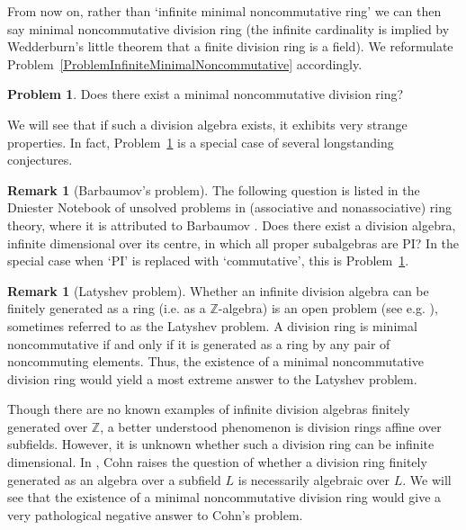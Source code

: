 \documentclass[11pt]{article}
\theoremstyle{definition}
\newtheorem{problem}[corollary]{Problem}
\newtheorem{remark}[corollary]{Remark}
\begin{document}
From now on, rather than `infinite minimal noncommutative ring' we can then say minimal noncommutative division ring (the infinite cardinality is implied by Wedderburn's little theorem that a finite division ring is a field). We reformulate Problem~\ref{ProblemInfiniteMinimalNoncommutative} accordingly.

\begin{problem}\label{ProblemMinimalNoncommutativeDivision}
Does there exist a minimal noncommutative division ring?\end{problem}

We will see that if such a division algebra exists, it exhibits very strange properties. In fact, Problem~\ref{ProblemMinimalNoncommutativeDivision} is a special case of several longstanding conjectures.

\begin{remark}[Barbaumov's problem]\label{RemarkBarbaumov}
The following question is listed in the Dniester Notebook of unsolved problems in (associative and nonassociative) ring theory, where it is attributed to Barbaumov \cite[Problem~1.14]{DniesterNotebook}. Does there exist a division algebra, infinite dimensional over its centre, in which all proper subalgebras are PI? In the special case when `PI' is replaced with `commutative', this is Problem~\ref{ProblemMinimalNoncommutativeDivision}.
\end{remark}

\begin{remark}[Latyshev problem]\label{RemarkLatyshev}
Whether an infinite division algebra can be finitely generated as a ring (i.e. as a $\mathbb{Z}$-algebra) is an open problem (see e.g. \cite[Problem~1.171]{DniesterNotebook}), sometimes referred to as the Latyshev problem. A division ring is minimal noncommutative if and only if it is generated as a ring by any pair of noncommuting elements. Thus, the existence of a minimal noncommutative division ring would yield a most extreme answer to the Latyshev problem.
\end{remark}

Though there are no known examples of infinite division algebras finitely generated over $\mathbb{Z}$, a better understood phenomenon is division rings affine over subfields. However, it is unknown whether such a division ring can be infinite dimensional. In \cite[p.412]{SkewFieldsCohn}, Cohn raises the question of whether a division ring finitely generated as an algebra over a subfield $L$ is necessarily algebraic over $L$. We will see that the existence of a minimal noncommutative division ring would give a very pathological negative answer to Cohn's problem.
\end{document}
